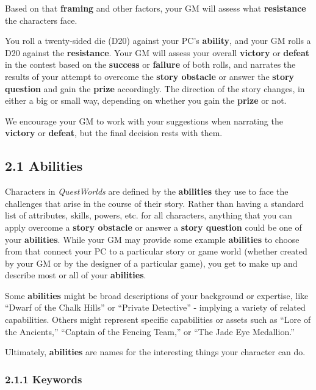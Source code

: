 \documentclass[
  11pt,
]{article}
\begin{document}
Based on that \textbf{framing} and other factors, your GM will assess
what \textbf{resistance} the characters face.

You roll a twenty-sided die (D20) against your PC's \textbf{ability},
and your GM rolls a D20 against the \textbf{resistance}. Your GM will
assess your overall \textbf{victory} or \textbf{defeat} in the contest
based on the \textbf{success} or \textbf{failure} of both rolls, and
narrates the results of your attempt to overcome the \textbf{story
obstacle} or answer the \textbf{story question} and gain the
\textbf{prize} accordingly. The direction of the story changes, in
either a big or small way, depending on whether you gain the
\textbf{prize} or not.

We encourage your GM to work with your suggestions when narrating the
\textbf{victory} or \textbf{defeat}, but the final decision rests with
them.

\hypertarget{abilities}{%
\subsection{2.1 Abilities}\label{abilities}}

Characters in \emph{QuestWorlds} are defined by the \textbf{abilities}
they use to face the challenges that arise in the course of their story.
Rather than having a standard list of attributes, skills, powers, etc.
for all characters, anything that you can apply overcome a \textbf{story
obstacle} or answer a \textbf{story question} could be one of your
\textbf{abilities}. While your GM may provide some example
\textbf{abilities} to choose from that connect your PC to a particular
story or game world (whether created by your GM or by the designer of a
particular game), you get to make up and describe most or all of your
\textbf{abilities}.

Some \textbf{abilities} might be broad descriptions of your background
or expertise, like ``Dwarf of the Chalk Hills'' or ``Private Detective''
- implying a variety of related capabilities. Others might represent
specific capabilities or assets such as ``Lore of the Ancients,''
``Captain of the Fencing Team,'' or ``The Jade Eye Medallion.''

Ultimately, \textbf{abilities} are names for the interesting things your
character can do.

\hypertarget{keywords}{%
\subsubsection{2.1.1 Keywords}\label{keywords}}
\end{document}

